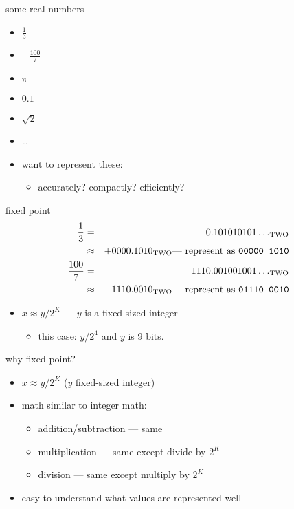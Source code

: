 \begin{frame}{some real numbers}
\begin{itemize}
\item $\frac{1}{3}$
\item $-\frac{100}{7}$
\item $\pi$
\item $0.1$
\item $\sqrt{2}$
\item \ldots
\vspace{.5cm}
\item want to represent these:
    \begin{itemize}
    \item accurately? compactly? efficiently?
    \end{itemize}
\end{itemize}
\end{frame}

\begin{frame}{fixed point}
\begin{eqnarray*}
\frac{1}{3} &=& 0.101010101\ldots_\text{TWO}  \\\
            &\approx& +0000.1010_\text{TWO} \text{--- represent as {\tt 00000 1010}} \\
\frac{100}{7} &=& 1110.001001001\ldots_\text{TWO}  \\
            &\approx& -1110.0010_\text{TWO} \text{--- represent as {\tt 01110 0010}} \\
\end{eqnarray*}
\begin{itemize}
\item<2-> $x \approx y/2^K$ --- $y$ is a fixed-sized integer
\begin{itemize}
    \item this case: $y/2^4$ and $y$ is 9 bits.
\end{itemize}
\end{itemize}
\end{frame}

\begin{frame}{why fixed-point?}
\begin{itemize}
\item $x \approx y/2^K$ ($y$ fixed-sized integer)
\item math similar to integer math:
    \begin{itemize}
    \item addition/subtraction --- same
    \item multiplication --- same except divide by $2^K$ 
    \item division --- same except multiply by $2^K$
    \end{itemize}
\item easy to understand what values are represented well
\end{itemize}
\end{frame}

